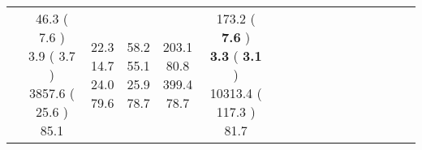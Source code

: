 \documentclass[9pt]{article}
\begin{document}
\begin{landscape}
\begin{longtable}{ l | c c c c | c c c c | c c c c | c c c c |}
 &
                    
                            \makecell{              46.3
     (             7.6
    ) \\
            {\footnotesize             3.9
     (              3.7
     )} \\
            {\footnotesize             3857.6
     (            25.6
    ) } \\
            {\small  \textcolor[rgb]{ 0.498 , 0.402 , 0.1} {85.1  }
} }


             &
                            \makecell{              22.3
     \\
            {\footnotesize             14.7
    } \\  {\footnotesize             24.0
     } \\
            {\small \textcolor[rgb]{ 0.608 , 0.292 , 0.1} {79.6  }
} }
             &                         \makecell{              58.2
     \\
            {\footnotesize             55.1
    } \\  {\footnotesize             25.9
     } \\
            {\small \textcolor[rgb]{ 0.626 , 0.275 , 0.1} {78.7  }
} }
             &
                            \makecell{              203.1
     \\
            {\footnotesize             80.8
    } \\  {\footnotesize             399.4
     } \\
            {\small \textcolor[rgb]{ 0.626 , 0.275 , 0.1} {78.7  }
} }
            

 & 
                            \makecell{              173.2
     (             \textbf{ 7.6 }
    ) \\
            {\footnotesize             \textbf{ 3.3 }
     (              \textbf{ 3.1 }
     )} \\
            {\footnotesize             10313.4
     (            117.3
    ) } \\
            {\small  \textcolor[rgb]{ 0.566 , 0.335 , 0.1} {81.7  }
} }



\end{longtable}
\end{landscape}
\end{document}
